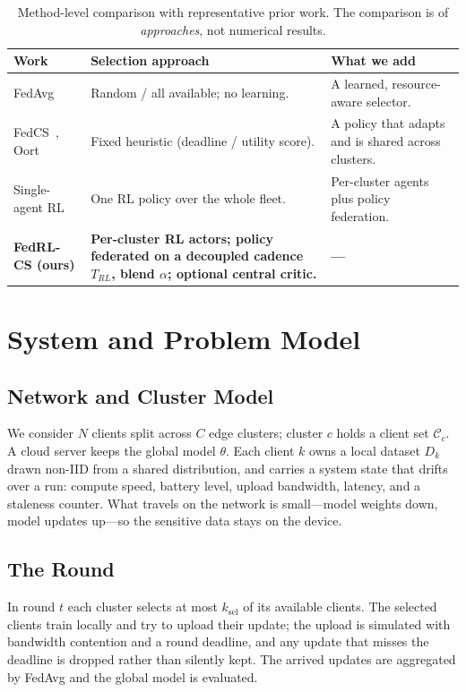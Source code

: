 \documentclass[conference]{IEEEtran}
\begin{document}
\begin{table}[t]
\caption{Method-level comparison with representative prior work. The comparison is
of \emph{approaches}, not numerical results.}
\label{tab:related}
\centering
\footnotesize
\begin{tabular}{p{1.5cm}p{3.0cm}p{2.6cm}}
\toprule
Work & Selection approach & What we add \\
\midrule
FedAvg~\cite{mcmahan2017} & Random / all available; no learning. & A learned,
resource-aware selector. \\
FedCS~\cite{nishio2019}, Oort~\cite{lai2021} & Fixed heuristic (deadline / utility
score). & A policy that adapts and is shared across clusters. \\
Single-agent RL~\cite{wang2020} & One RL policy over the whole fleet. & Per-cluster
agents plus policy federation. \\
\textbf{FedRL-CS (ours)} & \textbf{Per-cluster RL actors; policy federated on a
decoupled cadence $T_{RL}$, blend $\alpha$; optional central critic.} &
\textbf{---} \\
\bottomrule
\end{tabular}
\end{table}

\section{System and Problem Model}
\subsection{Network and Cluster Model}
We consider $N$ clients split across $C$ edge clusters; cluster $c$ holds a client
set $\mathcal{C}_c$. A cloud server keeps the global model $\theta$. Each client
$k$ owns a local dataset $D_k$ drawn non-IID from a shared distribution, and
carries a system state that drifts over a run: compute speed, battery level,
upload bandwidth, latency, and a staleness counter. What travels on the network is
small---model weights down, model updates up---so the sensitive data stays on the
device.

\subsection{The Round}
In round $t$ each cluster selects at most $k_{\mathrm{sel}}$ of its available
clients. The selected clients train locally and try to upload their update; the
upload is simulated with bandwidth contention and a round deadline, and any update
that misses the deadline is dropped rather than silently kept. The arrived updates
are aggregated by FedAvg and the global model is evaluated.
\end{document}
